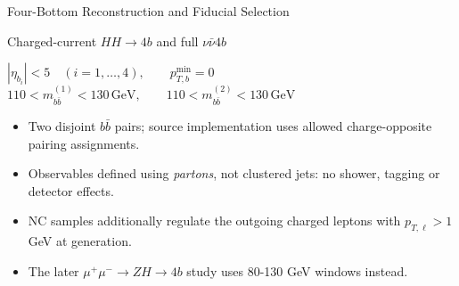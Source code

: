 \documentclass[aspectratio=1610,english]{beamer}
\newcommand{\src}[1]{\vfill{\par\color{black!65}\fontsize{6.4}{7.4}\selectfont\emph{Source:} #1\par}}
\begin{document}
\begin{frame}[t]{Four-Bottom Reconstruction and Fiducial Selection}
\small

\begin{block}{Charged-current $HH\to4b$ and full $\nu\bar\nu4b$}
\begin{center}
\large
$|\eta_{b_i}|<5\quad(i=1,\dots,4),\qquad p_{T,b}^{\min}=0$\\[.7em]
$110<m_{b\bar b}^{(1)}<130\,\mathrm{GeV},\qquad 110<m_{b\bar b}^{(2)}<130\,\mathrm{GeV}$
\end{center}
\end{block}
\begin{itemize}
\justifying 
\item Two disjoint $b\bar b$ pairs; source implementation uses allowed charge-opposite pairing assignments.
\item Observables defined using \emph{partons}, not clustered jets: no shower, tagging or detector effects.
\item NC samples additionally regulate the outgoing charged leptons with $p_{T,\ell}>1$ GeV at generation.
\item The later $\mu^+\mu^-\to ZH\to4b$ study uses 80-130 GeV windows instead.
\end{itemize}

\end{frame}
\end{document}
